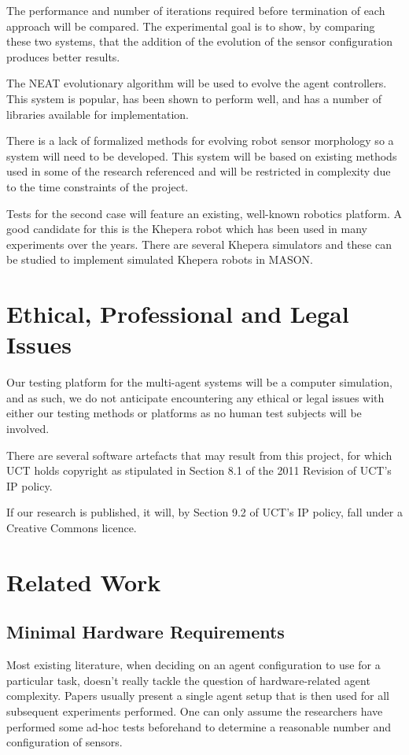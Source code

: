 \documentclass[a4paper,12pt]{article}
\begin{document}
The performance and number of iterations required before termination of each approach will be compared. The experimental goal is to show, by comparing these two systems, that the addition of the evolution of the sensor configuration produces better results.

The NEAT evolutionary algorithm will be used to evolve the agent controllers.\cite{Stanley02} This system is popular, has been shown to perform well, and has a number of libraries available for implementation.

There is a lack of formalized methods for evolving robot sensor morphology so a system will need to be developed. This system will be based on existing methods used in some of the research referenced and will be restricted in complexity due to the time constraints of the project.

Tests for the second case will feature an existing, well-known robotics platform. A good candidate for this is the Khepera robot which has been used in many experiments over the years. There are several Khepera simulators and these can be studied to implement simulated Khepera robots in MASON.

\section{Ethical, Professional and Legal Issues}

Our testing platform for the multi-agent systems will be a computer simulation, and as such, we do not anticipate encountering any ethical or legal issues with either our testing methods or platforms as no human test subjects will be involved.

There are several software artefacts that may result from this project, for which UCT holds copyright as stipulated in Section 8.1 of the 2011 Revision of UCT’s IP policy\cite{UCTIP}.

If our research is published, it will, by Section 9.2 of UCT’s IP policy, fall under a Creative Commons licence\cite{UCTIP}.


\section{Related Work}

\subsection{Minimal Hardware Requirements}
Most existing literature, when deciding on an agent configuration to use for a particular task, doesn’t really tackle the question of hardware-related agent complexity. Papers usually present a single agent setup that is then used for all subsequent experiments performed\cite{Waibel09, Sims94}. One can only assume the researchers have performed some ad-hoc tests beforehand to determine a reasonable number and configuration of sensors.
\end{document}
